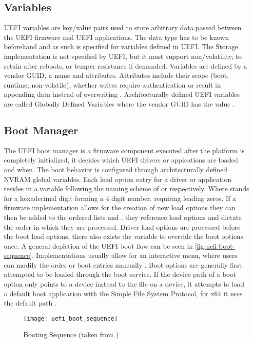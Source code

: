 \subsection{Variables}
\label{sec:uefi-pi:uefi:variables}

\ac{UEFI} variables are key/value pairs used to store arbitrary data passed between the \ac{UEFI} firmware and \ac{UEFI} applications.
The data type has to be known beforehand and as such is specified for variables defined in \ac{UEFI}.
The Storage implementation is not specified by \ac{UEFI}, but it must support non\-/volatility, to retain after reboots, or temper resistance if demanded.
Variables are defined by a vendor \ac{GUID}, a name and attributes.
Attributes include their scope (boot, runtime, non-volatile), whether writes require authentication or result in appending data instead of overwriting \cite[Section 8.2]{uefi-spec}.
Architecturally defined \ac{UEFI} variables are called Globally Defined Variables where the vendor \ac{GUID} has the value  \cite[Section 3.3]{uefi-spec}.

\subsection{Boot Manager}
\label{sec:uefi-pi:uefi:boot-manager}

The \ac{UEFI} boot manager is a firmware component executed after the platform is completely initialized, it decides which \ac{UEFI} drivers or applcations are loaded and when.
The boot behavior is configured through architecturally defined \ac{NVRAM} global variables\cite[Section 3.1]{uefi-spec}.
Each load option entry for a driver or application resides in a variable following the naming scheme of  or  respectively. Where \code{\#} stands for a hexadecimal digit forming a 4 digit number, requiring leading zeros.
If a firmware implementation allows for the creation of new load options they can then be added to the ordered lists  and , they reference load options and dictate the order in which they are processed.
Driver load options are processed before the boot load options, there also exists the  variable to override the boot options once.
A general depiction of the \ac{UEFI} boot flow can be seen in \autoref{fig:uefi-boot-sequence}.
Implementations usually allow for an interactive menu, where users can modify the order or boot entries manually \cite[Section 3.1.1]{uefi-spec}.
Boot options are generally first attempted to be loaded through the  boot service.
If the device path of a boot option only points to a device instead to the file on a device, it attempts to load a default boot application with the \hyperref[lst:simple-file-system-protocol]{Simple File System Protocol}\cite[Section 3.1.2]{uefi-spec}, for x64 it uses the default path  \cite[Section 3.5]{uefi-spec}.




\begin{figure}[htb]%
    \centering%
    \texttt{[image: uefi\_boot\_sequence]}%
    \caption{Booting Sequence (taken from \cite[Figure 2-1]{uefi-spec})}%
    \label{fig:uefi-boot-sequence}%
\end{figure}


